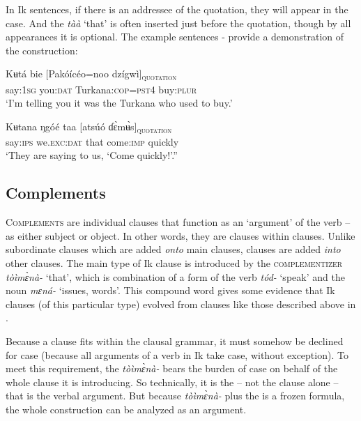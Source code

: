 In Ik  sentences, if there is an addressee of the quotation, they will appear in the  case. And the   \textit{tàà} ‘that’ is often inserted just before the quotation, though by all appearances it is optional. The example sentences - provide a demonstration of the  construction:



\ea\label{ex:syn:52}
\gll Kʉt{\Í}á     bie   [Pakóícéo=noo   dzígwì]\textsc{\textsubscript{quotation}} \\
say:\textsc{1sg}   you:\textsc{dat} Turkana:\textsc{cop=pst4} buy:\textsc{plur}    \\
\glt ‘I’m telling you it was the Turkana who used to buy.’ 
\z




\ea\label{ex:syn:53}
\gll Kʉtana ŋgóé  taa   [atsúó   ɗ\`{ɛ}m\`{ʉ}s]\textsc{\textsubscript{quotation}}  \\
say:\textsc{ips} we.\textsc{exc}:\textsc{dat}  that   come:\textsc{imp}   quickly    \\
\glt ‘They are saying to us, ‘Come quickly!’.” 
\z






\subsection{Complements}\label{sec:10.6}


\textsc{Complements} are individual clauses that function as an ‘argument’\textsc{} of the verb – as either subject or object. In other words, they are clauses within clauses. Unlike subordinate clauses which are added \textit{onto} main clauses,  clauses are added \textit{into} other clauses. The main type of Ik  clause is introduced by the \textsc{complementizer} \textit{tòìm\`{ɛ}nà-} ‘that’, which is combination of a form of the verb \textit{tód-} ‘speak’ and the noun \textit{mɛná-} ‘issues, words’. This compound word gives some evidence that Ik  clauses (of this particular type) evolved from  clauses like those described above in .

Because a  clause fits within the clausal grammar, it must somehow be declined for case (because all arguments of a verb in Ik take case, without exception). To meet this requirement, the  \textit{tòìm\`{ɛ}nà-} bears the burden of case on behalf of the whole  clause it is introducing. So technically, it is the  – not the  clause alone – that is the verbal argument. But because \textit{tòìm\`{ɛ}nà-} plus the  is a frozen  formula, the whole construction can be analyzed as an argument.

